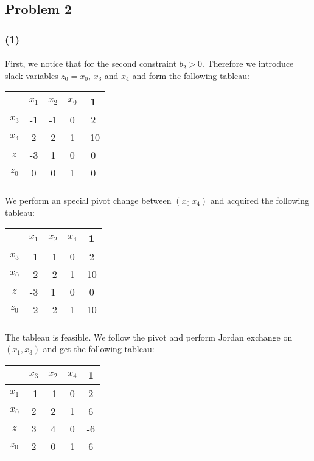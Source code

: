 \subsection*{Problem 2}
\subsubsection*{(1)}
\paragraph{}
First, we notice that for the second constraint $b_2>0$. Therefore we introduce slack variables $z_0 = x_0$, $x_3$ and $x_4$ and form the following tableau:
\begin{center}
	\begin{tabular}{ c | c  c  c | c }
		\      & $x_1$ & $x_2$ & $x_0$ &   1 \\ \hline
	 	 $x_3$ &    -1 &    -1 &     0 &   2 \\ 
		 $x_4$ &     2 &     2 &     1 & -10 \\ \hline
		   $z$ &    -3 &     1 &     0 &   0 \\
		 $z_0$ &     0 &     0 &     1 &   0 \\ 
	\end{tabular}
\end{center}
\paragraph{}
We perform an special pivot change between $(x_0 \ x_4)$ and acquired the following tableau:
\begin{center}
	\begin{tabular}{ c | c  c  c | c }
		\     & $x_1$ & $x_2$ & $x_4$ &   1 \\ \hline
		$x_3$ &    -1 &    -1 &     0 &   2 \\ 
		$x_0$ &    -2 &    -2 &     1 &  10 \\ \hline
	   	  $z$ &    -3 &     1 &     0 &   0 \\
		$z_0$ &    -2 &    -2 &     1 &  10 \\ 
	\end{tabular}
\end{center}
\paragraph{}
The tableau is feasible. We follow the pivot and perform Jordan exchange on $(x_1, x_3)$ and get the following tableau:
\begin{center}
	\begin{tabular}{ c | c  c  c | c }
		\     & $x_3$ & $x_2$ & $x_4$ &   1 \\ \hline
		$x_1$ &    -1 &    -1 &     0 &   2 \\ 
		$x_0$ &     2 &     2 &     1 &   6 \\ \hline
		$z$   &     3 &     4 &     0 &  -6 \\
		$z_0$ &     2 &     0 &     1 &   6 \\ 
	\end{tabular}
\end{center}
